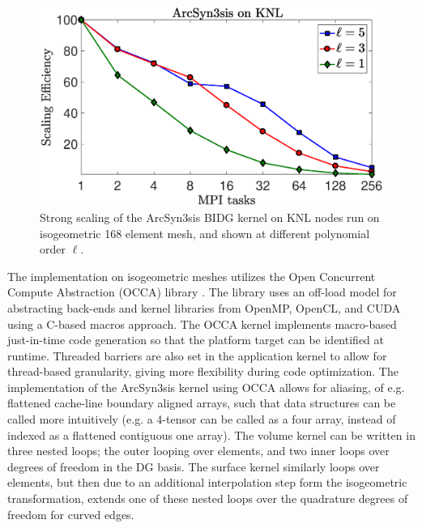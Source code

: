 \begin{figure}[h]
\begin{center}
\includegraphics[width=0.99\linewidth]{./bidg_data/2nd_try/scaling}
\end{center}
\vspace*{-.5cm}
\caption{Strong scaling of the ArcSyn3sis BIDG kernel on KNL nodes run on
isogeometric 168 element mesh, and shown at different polynomial order $\ell$.}
\label{fig:bidg_scaling}
\end{figure}

The implementation on isogeometric meshes utilizes the Open Concurrent Compute
Abstraction (OCCA) library \cite{MedinaPress}.  The library uses an off-load
model for abstracting back-ends and kernel libraries from OpenMP, OpenCL, and
CUDA using a C-based macros approach.  The OCCA kernel implements macro-based
just-in-time code generation so that the platform target can be identified at
runtime.  Threaded barriers are also set in the application kernel to allow for
thread-based granularity, giving more flexibility during code optimization.
The implementation of the ArcSyn3sis kernel using OCCA allows for aliasing, of
e.g. flattened cache-line boundary aligned arrays, such that data structures
can be called more intuitively (e.g. a 4-tensor can be called as a four array,
instead of indexed as a flattened contiguous one array).  The volume kernel can
be written in three nested loops; the outer looping over elements, and two
inner loops over degrees of freedom in the DG basis.  The surface kernel
similarly loops over elements, but then due to an additional interpolation step
form the isogeometric transformation, extends one of these nested loops over
the quadrature degrees of freedom for curved edges.

